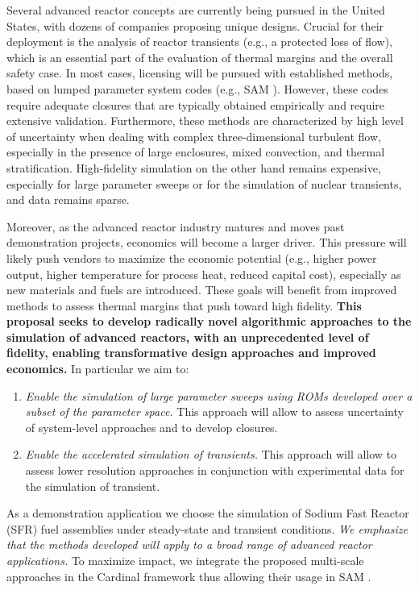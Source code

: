 Several  advanced reactor concepts are currently being pursued in the United
States, with dozens of companies proposing unique designs. Crucial for their
deployment is the analysis of  reactor transients (e.g., a protected loss of
flow), which is an essential part of the evaluation of thermal margins and the overall
safety case.  In most cases, licensing will be pursued with established
methods, based on lumped parameter system codes (e.g., SAM \cite{hu2021}).
However, these codes require adequate closures that are typically obtained
empirically and require extensive validation. Furthermore, these methods are
characterized by high level of uncertainty when dealing with complex
three-dimensional turbulent flow, especially in the presence of large
enclosures, mixed convection, and thermal stratification. High-fidelity
simulation on the other hand remains expensive, especially for
large parameter sweeps or for the simulation of nuclear transients, and data
remains sparse.

Moreover, as the advanced reactor industry matures and moves past demonstration
projects, economics will become a larger driver. This pressure will likely push
vendors to maximize the economic potential (e.g., higher power output,
higher temperature for process heat, reduced capital cost), especially as new
materials and fuels are introduced. These goals will benefit from
improved methods to assess thermal margins that push toward high fidelity.
\textbf{This proposal seeks to develop radically novel algorithmic approaches
to the simulation of advanced reactors, with an unprecedented level of
fidelity, enabling transformative design approaches and improved economics.}
In particular we aim to:
\begin{enumerate}
%
   \item \textit{Enable the simulation of large parameter sweeps using
   ROMs developed over a subset of the parameter space.} This approach
   will allow to assess uncertainty of system-level approaches and to develop
   closures.
%
   \item \textit{Enable the accelerated simulation of transients.}
   This approach will allow to assess lower resolution approaches in conjunction
   with experimental data for the simulation of transient.
\\[-5ex]
\end{enumerate}
As a demonstration application we choose the simulation of Sodium Fast Reactor
(SFR) fuel assemblies under steady-state and transient conditions. \textit{We
emphasize that the methods developed will apply to a broad range of advanced
reactor applications.} To maximize impact, we integrate the proposed multi-scale approaches in the Cardinal \cite{cardinal} framework thus allowing their usage in SAM \cite{hu2021}.

